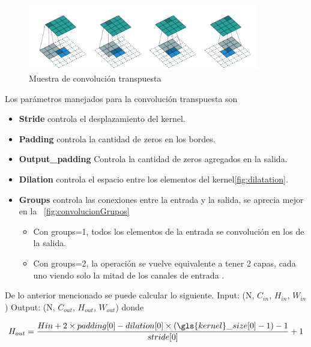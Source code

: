 \begin{figure}[H]
    \centering
    \includegraphics[width =0.9\textwidth]{images/convolucion/ima41.jpg}
    \caption{Muestra de convolución transpuesta}
    \label{fig:my_label}
\end{figure}
Los parámetros manejados para la convolución transpuesta son 
\begin{itemize}
    \item   \textbf{Stride} controla el desplazamiento del \gls{kernel}.

    \item \textbf{Padding} controla la cantidad de zeros en los bordes.

    \item \textbf{Output\_padding} Controla la cantidad de zeros agregados en la salida.

    \item \textbf{Dilation} controla el espacio entre los elementos del \gls{kernel}\ref{fig:dilatation}.

    \item \textbf{Groups} controla las conexiones entre la entrada y la salida, se aprecia mejor en la \figurename~\ref{fig:convolucionGrupos}
    \begin{itemize}
        \item  Con groups=1, todos los elementos de la entrada se convolución en los de la salida.

        \item    Con groups=2, la operación se vuelve equivalente a tener 2 capas, cada uno viendo solo la mitad de los canales de entrada .

     

    \end{itemize}
            
\end{itemize}
   
De lo anterior mencionado se puede calcular lo siguiente.
        Input: (N, $C_{in}$, $H_{in}$, $W_{in}$)
        Output: (N, $C_{out}$, $H_{out}$, $W_{out}$) donde

        
        \begin{equation}
            H_{out} = \frac{H{in}+2\times padding[0]-dilation[0]\times (\gls{kernel}\_size[0]-1)-1}{stride[0]} +1
        \end{equation}
         
